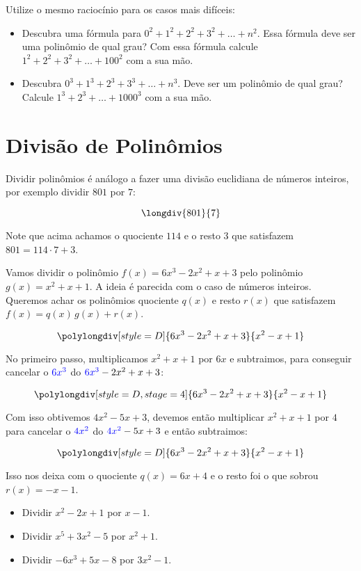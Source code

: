 \documentclass[a4paper,fleqn,12pt]{article}
\begin{document}
\n

Utilize o mesmo raciocínio para os casos mais difíceis:

\begin{itemize}
\item Descubra uma fórmula para $0^2 + 1^2 + 2^2 + 3^2 + \ldots + n^2$. Essa fórmula deve ser uma polinômio de qual grau? Com essa fórmula calcule $1^2 + 2^2 + 3^2 + \ldots + 100^2$ com a sua mão.
\item Descubra $0^3 + 1^3 + 2^3 + 3^3 + \ldots + n^3$. Deve ser um polinômio de qual grau? Calcule $1^3 + 2^3 + \ldots + 1000^3$ com a sua mão.
\end{itemize}

\pagebreak

\section{Divisão de Polinômios}

Dividir polinômios é análogo a fazer uma divisão euclidiana de números inteiros, por exemplo dividir $801$ por $7$:

$$\longdiv{801}{7}$$

Note que acima achamos o quociente $114$ e o resto $3$ que satisfazem $801 = 114 \cdot 7 + 3$.

\n\n

Vamos dividir o polinômio $f(x) = 6x^3 - 2x^2 + x + 3$ pelo polinômio $g(x) = x^2 + x + 1$. A ideia é parecida com o caso de números inteiros. Queremos achar os polinômios quociente $q(x)$ e resto $r(x)$ que satisfazem $f(x) = q(x) \, g(x) + r(x)$.

$$\polylongdiv[style=D]{6x^3-2x^2+x+3}{x^2-x+1}$$

No primeiro passo, multiplicamos $x^2 + x + 1$ por $\boxed{6x}$ e subtraimos, para conseguir cancelar o $\textcolor{blue}{6x^3}$ do $\textcolor{blue}{6x^3} - 2x^2 + x + 3$:

$$\polylongdiv[style=D, stage=4]{6x^3-2x^2+x+3}{x^2-x+1}$$

Com isso obtivemos $4x^2 - 5x + 3$, devemos então multiplicar $x^2 + x + 1$ por $\boxed{4}$ para cancelar o $\textcolor{blue}{4x^2}$ do $\textcolor{blue}{4x^2} - 5x + 3$ e então subtraimos:

$$\polylongdiv[style=D]{6x^3-2x^2+x+3}{x^2-x+1}$$

Isso nos deixa com o quociente $\boxed{q(x) = 6x + 4}$ e o resto foi o que sobrou $r(x) = - x - 1$.

\begin{itemize}
\item Dividir $x^2 - 2x + 1$ por $x - 1$.
\item Dividir $x^5 + 3x^2 - 5$ por $x^2 + 1$.
\item Dividir $-6x^3 + 5x - 8$ por $3x^2 - 1$.
\end{itemize}
\end{document}
